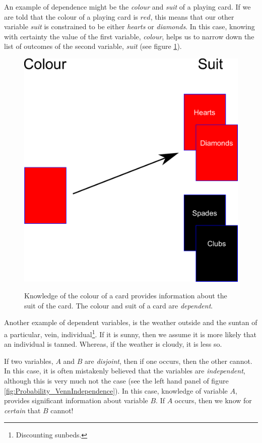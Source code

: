 \documentclass[11pt,fullpage]{book}
\begin{document}
An example of dependence might be the \textit{colour} and \textit{suit} of a playing card. If we are told that the colour of a playing card is $red$, this means that our other variable \textit{suit} is constrained to be either \textit{hearts} or \textit{diamonds}. In this case, knowing with certainty the value of the first variable, \textit{colour}, helps us to narrow down the list of outcomes of the second variable, \textit{suit} (see figure \ref{fig:Probability_IndependenceCards}).

\begin{figure}
\centering
\scalebox{0.3} 
{\includegraphics{Probability_IndependenceCards.pdf}}
\caption{Knowledge of the colour of a card provides information about the suit of the card. The colour and suit of a card are \textit{dependent}.}\label{fig:Probability_IndependenceCards}
\end{figure}

Another example of dependent variables, is the weather outside and the suntan of a particular, vein, individual\footnote{Discounting sunbeds.}. If it is sunny, then we assume it is more likely that an individual is tanned. Whereas, if the weather is cloudy, it is less so.

If two variables, $A$ and $B$ are \textit{disjoint}, then if one occurs, then the other cannot. In this case, it is often mistakenly believed that the variables are \textit{independent}, although this is very much not the case (see the left hand panel of figure \ref{fig:Probability_VennIndependence}). In this case, knowledge of variable $A$, provides significant information about variable $B$. If $A$ occurs, then we know for \textit{certain} that $B$ cannot!
\end{document}
